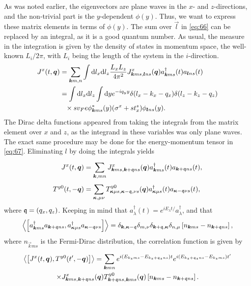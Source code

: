 As was noted earlier, the eigenvectors are plane waves in the \( x \)- and \( z \)-directions, and the non-trivial part is the $y$-dependent $\phi (y)$.
Thus, we want to express these matrix elements in terms of $\phi (y)$.
The sum over $\vec{l}$ in \cref{eq:66} can be replaced by an integral, as it is a good quantum number.
As usual, the measure in the integration is given by the density of states in momentum space, the well-known $L_{i} /2\pi $, with $L_i$ being the length of the system in the $i$-direction.
\begin{align}
  J^x(t, \vec{q}) &= \sum\limits_{\vec{k}m, n}^{} \int \mathrm{d}l_x \mathrm{d}l_z \frac{L_xL_z}{4 \pi ^2}
                    J^x_{\vec{k}ms, \vec{l}ns} (\vec{q}) a^{\dagger}_{\vec{k} ms} (t) a_{\vec{l} ns}(t)\\
  \nonumber &= \int \mathrm{d}l_x \mathrm{d} l_{z} \int \mathrm{d} y e^{-i q_y y}
                    \delta (l_x - k_x - q_x) \delta (l_z - k_z -  q_z)\\
                    \nonumber &\pe \times sv_F e \phi ^{*}_{\vec{k} ms}(y) (\sigma^x + s t^s_x) \phi _{\vec{l}ns}(y).
\end{align}
The Dirac delta functions appeared from taking the integrals from the matrix element over $x$ and $z$, as the integrand in these variables was only plane waves.
The exact same procedure may be done for the energy-momentum tensor in \cref{eq:67}.
Eliminating $l$ by doing the integrals yields
\begin{align}
  J^x(t, \bm{q}) &= \sum\limits_{\bm{k}, mn}^{}
                    J^x_{\bm{k}ms, \bm{k}+\mathfrak{q} ns}(\bm{q}) a^{\dagger}_{\bm{k} ms}(t) a_{\bm{k}+\mathfrak{q} ns}(t),\\
  T^{y 0}(t, -\bm{q}) &= \sum\limits_{\bm{\kappa}, \mu  \nu }^{} T^{y 0}_{\bm{\kappa } \mu  s, \bm{\kappa } - \mathfrak{q}, \nu  s}(\bm{q}) a^{\dagger}_{\bm{\kappa } \mu   s}(t) a_{\bm{\kappa } - \mathfrak{q} \nu  s}(t),
\end{align}
where ${\mathfrak{q}} = (q_x, q_z)$.
Keeping in mind that $a_{\lambda }^{\dagger} (t) = e^{i E_{\lambda } t /  }a_{\lambda }^{\dagger}$, and that
\begin{equation}
  \Braket{\left[
a^{\dagger}_{\bm{k}ms} a_{\bm{k}+\mathfrak{q} ns}, a^{\dagger}_{\bm{\kappa}\mu s} a_{\bm{\kappa}-\mathfrak{q} \nu  s}
\right]}
=
\delta_{\bm{k}, \bm{\kappa}-\mathfrak{q}}
\delta _{m, \nu }
\delta _{\bm{k}+\mathfrak{q}, \bm{\kappa}}
\delta _{n, \mu }
\left[ n_{\bm{k}ms}- n_{\bm{k}+\mathfrak{q} ns} \right],
\end{equation}
where \( n_{\vec{k} m s} \) is the Fermi-Dirac distribution, the correlation function is given by
\begin{multline}
  \Braket{\left[ J^x(t, \bm{q}), T^{y 0}(t', -\bm{q}) \right]}
  =
  \sum\limits_{\bm{k} mn}^{}
  e^{i( E_{k_zms} - E_{k_z+\mathfrak{q}_z ns} )t}
  e^{i( E_{k_z+\mathfrak{q}_z ns} - E_{k_z ms} ) t'}\\
  \times
  J^x_{\bm{k}ms, \bm{k}+\mathfrak{q}ns}(\bm{q})
  T^{y 0}_{\bm{k}+\mathfrak{q}ns, \bm{k}ms}(\bm{q})
  \left[ n_{\bm{k}ms}- n_{\bm{k}+\mathfrak{q} ns} \right].
\end{multline}

